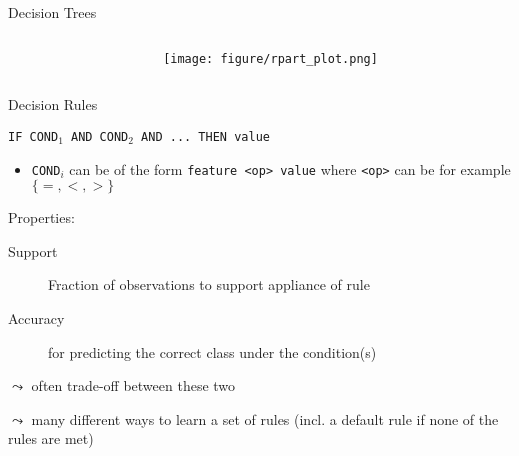 \documentclass[10pt,compress,t,notes=noshow, xcolor=table]{beamer}
\begin{document}
\begin{frame}{Decision Trees}

\begin{columns}[T]
  \begin{column}{0.5\textwidth}
     \tiny
     
  \end{column}
  \begin{column}{0.5\textwidth}
      \texttt{[image: figure/rpart\_plot.png]}
  \end{column}
\end{columns}

\end{frame}


\begin{frame}{Decision Rules}

\texttt{IF COND$_1$ AND COND$_2$ AND ... THEN value}

\begin{itemize}
    \item \texttt{COND$_i$} can be of the form \texttt{feature <op> value} where \texttt{<op>} can be for example $\{=, <, > \}$
\end{itemize}


\medskip

Properties:
\begin{description}
    \item[Support] Fraction of observations to support appliance of rule
    \item[Accuracy] for predicting the correct class under the condition(s)
\end{description}

$\leadsto$ often trade-off between these two


\medskip

$\leadsto$ many different ways to learn a set of rules (incl. a default rule if none of the rules are met)

\end{frame}



\end{document}
